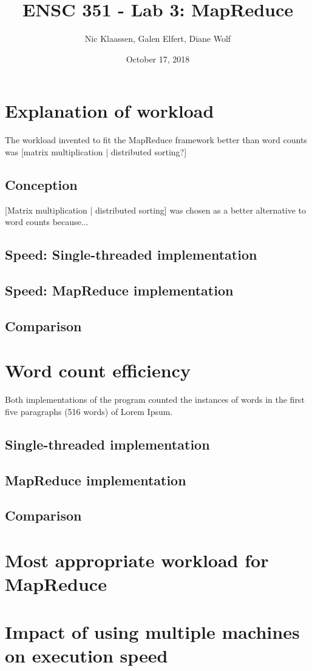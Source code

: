 \documentclass[12pt, letterpaper]{article}
\begin{document}
\title{ENSC 351 - Lab 3: MapReduce}
\date{October 17, 2018}
\author{Nic Klaassen, Galen Elfert, Diane Wolf}
\maketitle
\section{Explanation of workload}
	The workload invented to fit the MapReduce framework better than word counts was {[matrix multiplication | distributed sorting?]}
\subsection{Conception}
	{[Matrix multiplication | distributed sorting]} was chosen as a better alternative to word counts because...
\subsection{Speed: Single-threaded implementation}
\subsection{Speed: MapReduce implementation}
\subsection{Comparison}
\section{Word count efficiency}
	Both implementations of the program counted the instances of words in the first five paragraphs (516 words) of Lorem Ipsum.
\subsection{Single-threaded implementation}
\subsection{MapReduce implementation}
\subsection{Comparison}

\section{Most appropriate workload for MapReduce}

\section{Impact of using multiple machines on execution speed}
\end{document}
